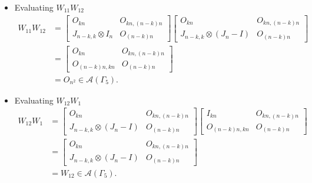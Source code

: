 \begin{itemize}
\item Evaluating $W_{11}W_{12}$
\begin{align*}
    W_{11}W_{12}
    &= \begin{bmatrix}
        O_{kn} & O_{kn, (n-k)n} \\
        J_{n-k, k}\otimes I_n & O_{(n-k)n}
    \end{bmatrix}
    \begin{bmatrix}
        O_{kn} & O_{kn, (n-k)n} \\
        J_{n-k, k}\otimes (J_n-I) & O_{(n-k)n}
    \end{bmatrix}\\
    &= \begin{bmatrix}
        O_{kn} & O_{kn, (n-k)n} \\
        O_{(n-k)n,kn} & O_{(n - k)n}
    \end{bmatrix}\\
    &= O_{n^2} \in\mathcal{A}(\Gamma_5).
\end{align*}

\item Evaluating $W_{12}W_{1}$
\begin{align*}
    W_{12}W_{1}
    &= \begin{bmatrix}
        O_{kn} & O_{kn, (n-k)n} \\
        J_{n-k, k}\otimes (J_n-I) & O_{(n-k)n}
    \end{bmatrix}
    \begin{bmatrix}
        I_{kn} & O_{kn, (n-k)n} \\
        O_{(n-k)n,kn} & O_{(n-k)n}
    \end{bmatrix}\\
    &= \begin{bmatrix}
        O_{kn} & O_{kn, (n-k)n} \\
        J_{n-k, k}\otimes (J_n-I) & O_{(n-k)n}
    \end{bmatrix}\\
    &= W_{12}\in\mathcal{A}(\Gamma_5).
\end{align*}


\end{itemize}
